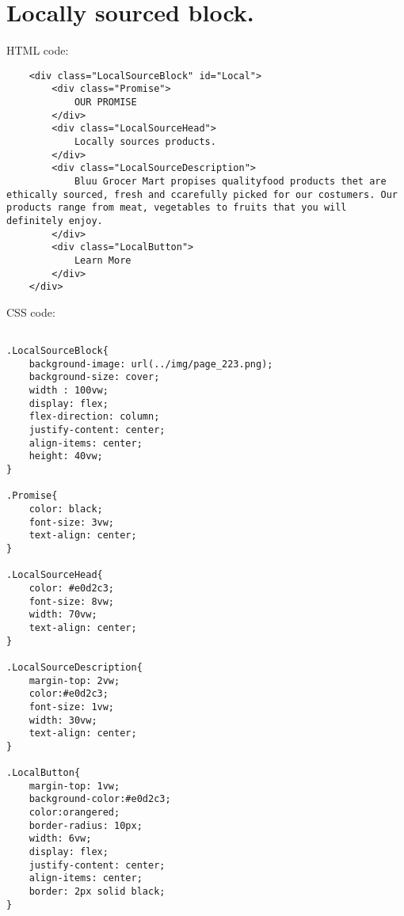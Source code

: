\section{Locally sourced block.}
HTML code:
\begin{verbatim}
    <div class="LocalSourceBlock" id="Local">
        <div class="Promise">
            OUR PROMISE
        </div>
        <div class="LocalSourceHead">
            Locally sources products.
        </div>
        <div class="LocalSourceDescription">
            Bluu Grocer Mart propises qualityfood products thet are ethically sourced, fresh and ccarefully picked for our costumers. Our products range from meat, vegetables to fruits that you will definitely enjoy.
        </div>
        <div class="LocalButton">
            Learn More
        </div>
    </div>
\end{verbatim}
CSS code:
\begin{verbatim}
    
.LocalSourceBlock{
    background-image: url(../img/page_223.png);
    background-size: cover;
    width : 100vw;
    display: flex;
    flex-direction: column;
    justify-content: center;
    align-items: center;
    height: 40vw;
}

.Promise{
    color: black;
    font-size: 3vw;
    text-align: center;
}

.LocalSourceHead{
    color: #e0d2c3;
    font-size: 8vw;
    width: 70vw;
    text-align: center;
}

.LocalSourceDescription{
    margin-top: 2vw;
    color:#e0d2c3;
    font-size: 1vw;
    width: 30vw;
    text-align: center;
}

.LocalButton{
    margin-top: 1vw;
    background-color:#e0d2c3;
    color:orangered;
    border-radius: 10px;
    width: 6vw;
    display: flex;
    justify-content: center;
    align-items: center;
    border: 2px solid black;
}
\end{verbatim}

